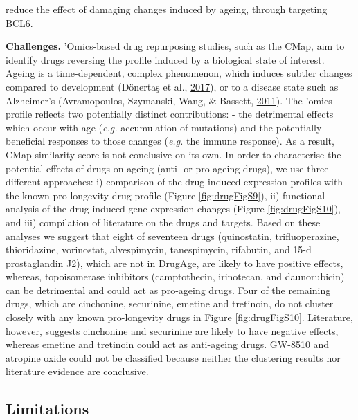 \documentclass[12pt,twoside]{unicam}
\begin{document}
reduce the effect of damaging changes induced by ageing, through targeting BCL6.

\textbf{Challenges.} 'Omics-based drug repurposing studies, such as the CMap, aim to identify drugs reversing the profile induced by a biological state of interest. Ageing is a time-dependent, complex phenomenon, which induces subtler changes compared to development (Dönertaş et al., \protect\hyperlink{ref-Donertas2017}{2017}), or to a disease state such as Alzheimer's (Avramopoulos, Szymanski, Wang, \& Bassett, \protect\hyperlink{ref-Avramopoulos2011}{2011}). The 'omics profile reflects two potentially distinct contributions: - the detrimental effects which occur with age (\emph{e.g.} accumulation of mutations) and the potentially beneficial responses to those changes (\emph{e.g.} the immune response). As a result, CMap similarity score is not conclusive on its own. In order to characterise the potential effects of drugs on ageing (anti- or pro-ageing drugs), we use three different approaches: i) comparison of the drug-induced expression profiles with the known pro-longevity drug profile (Figure \ref{fig:drugFigS9}), ii) functional analysis of the drug-induced gene expression changes (Figure \ref{fig:drugFigS10}), and iii) compilation of literature on the drugs and targets. Based on these analyses we suggest that eight of seventeen drugs (quinostatin, trifluoperazine, thioridazine, vorinostat, alvespimycin, tanespimycin, rifabutin, and 15-d prostaglandin J2), which are not in DrugAge, are likely to have positive effects, whereas, topoisomerase inhibitors (camptothecin, irinotecan, and daunorubicin) can be detrimental and could act as pro-ageing drugs. Four of the remaining drugs, which are cinchonine, securinine, emetine and tretinoin, do not cluster closely with any known pro-longevity drugs in Figure \ref{fig:drugFigS10}. Literature, however, suggests cinchonine and securinine are likely to have negative effects, whereas emetine and tretinoin could act as anti-ageing drugs. GW-8510 and atropine oxide could not be classified because neither the clustering results nor literature evidence are conclusive.

\hypertarget{limitations-2}{%
\subsection{Limitations}\label{limitations-2}}
\end{document}
